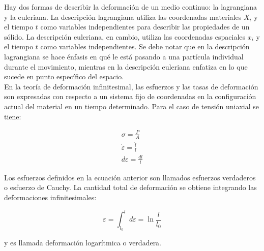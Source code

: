 Hay dos formas de describir la deformación de un medio continuo: la lagrangiana y la euleriana. 
La descripción lagrangiana utiliza las coordenadas materiales $X_i$ y el tiempo $t$ como variables 
independientes para describir las propiedades de un sólido. La descripción euleriana, en cambio, 
utiliza las coordenadas espaciales $x_i$ y el tiempo $t$ como variables independientes. 
Se debe notar que en la descripción lagrangiana se hace énfasis en qué le está pasando a una 
partícula individual durante el movimiento, mientras en la descripción euleriana enfatiza en 
lo que sucede en punto específico del espacio. \\

En la teoría de deformación infinitesimal, las esfuerzos y las tasas de deformación son expresadas 
con respecto a un sistema fijo de coordenadas en la configuración actual del material en 
un tiempo determinado. Para el caso de tensión uniaxial se tiene: ~\cite{kobayashi1989}

\begin{align}
\sigma = \frac{P}{A} \label{eq:simple_stress} \\ 
\dot{\varepsilon} = \frac{\dot{l}}{l} \label{eq:strain_rate} \\
d\varepsilon = \frac{dl}{l} \label{eq:strain_diff}
\end{align}

Los esfuerzos definidos en la ecuación anterior son llamados esfuerzos verdaderos o 
esfuerzo de Cauchy. La cantidad total de deformación se obtiene integrando las deformaciones 
infinitesimales:

\begin{equation} \label{eq:true_strain_integral}
\varepsilon = \int_{l_0}^{l} d\varepsilon = \ln{\frac{l}{l_0}}
\end{equation}

y es llamada deformación logarítmica o verdadera.\\

